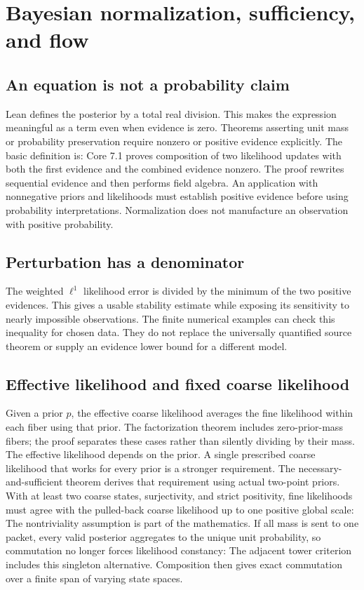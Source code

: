 \clearpage\section{Bayesian normalization, sufficiency, and flow}
\label{sec:bayes}
\subsection{An equation is not a probability claim}
Lean defines the posterior by a total real division. This makes the expression meaningful as a term even when evidence is zero. Theorems asserting unit mass or probability preservation require nonzero or positive evidence explicitly. The basic definition is:
Core 7.1 proves composition of two likelihood updates with both the first evidence and the combined evidence nonzero. The proof rewrites sequential evidence and then performs field algebra.
An application with nonnegative priors and likelihoods must establish positive evidence before using probability interpretations. Normalization does not manufacture an observation with positive probability.

\subsection{Perturbation has a denominator}
The weighted $\ell^1$ likelihood error is divided by the minimum of the two positive evidences. This gives a usable stability estimate while exposing its sensitivity to nearly impossible observations.
The finite numerical examples can check this inequality for chosen data. They do not replace the universally quantified source theorem or supply an evidence lower bound for a different model.

\subsection{Effective likelihood and fixed coarse likelihood}
Given a prior $p$, the effective coarse likelihood averages the fine likelihood within each fiber using that prior. The factorization theorem includes zero-prior-mass fibers; the proof separates these cases rather than silently dividing by their mass.
The effective likelihood depends on the prior. A single prescribed coarse likelihood that works for every prior is a stronger requirement. The necessary-and-sufficient theorem derives that requirement using actual two-point priors. With at least two coarse states, surjectivity, and strict positivity, fine likelihoods must agree with the pulled-back coarse likelihood up to one positive global scale:
The nontriviality assumption is part of the mathematics. If all mass is sent to one packet, every valid posterior aggregates to the unique unit probability, so commutation no longer forces likelihood constancy:
The adjacent tower criterion includes this singleton alternative. Composition then gives exact commutation over a finite span of varying state spaces.

